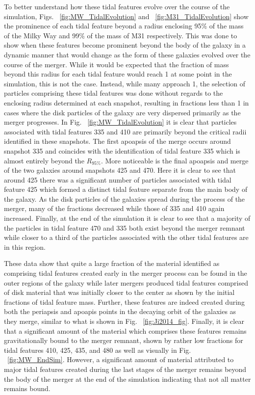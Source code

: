 \documentclass[fleqn,usenatbib]{mnras}
\begin{document}
To better understand how these tidal features evolve over the course of the simulation, Figs. ~\ref{fig:MW_TidalEvolution} and ~\ref{fig:M31_TidalEvolution} show the prominence of each tidal feature beyond a radius enclosing 95\% of the mass of the Milky Way and 99\% of the mass of M31 respectively. This was done to show when these features become prominent beyond the body of the galaxy in a dynamic manner that would change as the form of these galaxies evolved over the course of the merger. While it would be expected that the fraction of mass beyond this radius for each tidal feature would reach 1 at some point in the simulation, this is not the case. Instead, while many approach 1, the selection of particles comprising these tidal features was done without regards to the enclosing radius determined at each snapshot, resulting in fractions less than 1 in cases where the disk particles of the galaxy are very dispersed primarily as the merger progresses. In Fig. ~\ref{fig:MW_TidalEvolution} it is clear that particles associated with tidal features 335 and 410 are primarily beyond the critical radii identified in these snapshots. The first apoapsis of the merge occurs around snapshot 335 and coincides with the identification of tidal feature 335 which is almost entirely beyond the $R_{95\%}$. More noticeable is the final apoapsis and merge of the two galaxies around snapshots 425 and 470. Here it is clear to see that around 425 there was a significant number of particles associated with tidal feature 425 which formed a distinct tidal feature separate from the main body of the galaxy. As the disk particles of the galaxies spread during the process of the merger, many of the fractions decreased while those of 335 and 410 again increased. Finally, at the end of the simulation it is clear to see that a majority of the particles in tidal feature 470 and 335 both exist beyond the merger remnant while closer to a third of the particles associated with the other tidal features are in this region.

These data show that quite a large fraction of the material identified as comprising tidal features created early in the merger process can be found in the outer regions of the galaxy while later mergers produced tidal features comprised of disk material that was initially closer to the center as shown by the initial fractions of tidal feature mass. Further, these features are indeed created during both the periapsis and apoapis points in the decaying orbit of the galaxies as they merge, similar to what is shown in Fig. ~\ref{fig:Ji2014_fig}. Finally, it is clear that a significant amount of the material which comprises these features remains gravitationally bound to the merger remnant, shown by rather low fractions for tidal features 410, 425, 435, and 480 as well as visually in Fig. ~\ref{fig:MW_EndSim}. However, a significant amount of material attributed to major tidal features created during the last stages of the merger remains beyond the body of the merger at the end of the simulation indicating that not all matter remains bound.
\end{document}
